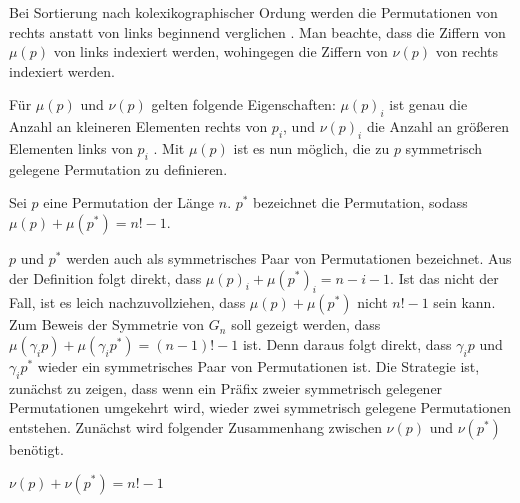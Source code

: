 \documentclass[a4paper, 10pt, ngerman]{article}
\begin{document}
Bei Sortierung nach kolexikographischer Ordung werden die Permutationen von rechts anstatt von links beginnend verglichen \cite{lexicographic}. Man beachte, dass die Ziffern von $\mu(p)$ von links indexiert werden, wohingegen die Ziffern von $\nu(p)$ von rechts indexiert werden.

Für $\mu(p)$ und $\nu(p)$ gelten folgende Eigenschaften: $\mu(p)_i$ ist genau die Anzahl an kleineren Elementen rechts von $p_i$, und $\nu(p)_i$ die Anzahl an größeren Elementen links von $p_i$ \cite{factorial}. Mit $\mu(p)$ ist es nun möglich, die zu $p$ symmetrisch gelegene Permutation zu definieren.

\begin{definition}
    Sei $p$ eine Permutation der Länge $n$. $p^*$ bezeichnet die Permutation, sodass $\mu(p) + \mu(p^*) = n! - 1$.
\end{definition}

$p$ und $p^*$ werden auch als symmetrisches Paar von Permutationen bezeichnet. Aus der Definition folgt direkt, dass $\mu(p)_i + \mu(p^*)_i = n - i - 1$. Ist das nicht der Fall, ist es leich nachzuvollziehen, dass $\mu(p) + \mu(p^*)$ nicht $n! - 1$ sein kann. Zum Beweis der Symmetrie von $G_n$ soll gezeigt werden, dass $\mu(\gamma_i p) + \mu(\gamma_i p^*) = (n - 1)! - 1$ ist. Denn daraus folgt direkt, dass $\gamma_i p$ und $\gamma_i p^*$ wieder ein symmetrisches Paar von Permutationen ist. Die Strategie ist, zunächst zu zeigen, dass wenn ein Präfix zweier symmetrisch gelegener Permutationen umgekehrt wird, wieder zwei symmetrisch gelegene Permutationen entstehen. Zunächst wird folgender Zusammenhang zwischen $\nu(p)$ und $\nu(p^*)$ benötigt.

\begin{lemma}
    $\nu(p) + \nu(p^*) = n! - 1$ 
\end{lemma}
\end{document}
